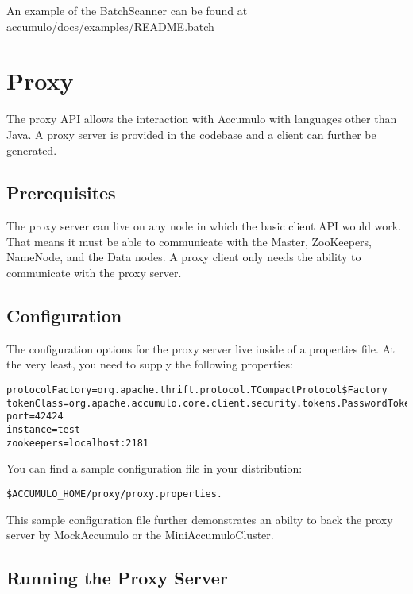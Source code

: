 An example of the BatchScanner can be found at\\
accumulo/docs/examples/README.batch

\section{Proxy}

The proxy API allows the interaction with Accumulo with languages other than Java.
A proxy server is provided in the codebase and a client can further be generated.

\subsection{Prerequisites}

The proxy server can live on any node in which the basic client API would work. That
means it must be able to communicate with the Master, ZooKeepers, NameNode, and the
Data nodes. A proxy client only needs the ability to communicate with the proxy server.


\subsection{Configuration}

The configuration options for the proxy server live inside of a properties file. At
the very least, you need to supply the following properties:

\begingroup\fontsize{8pt}{8pt}\selectfont\begin{verbatim}
protocolFactory=org.apache.thrift.protocol.TCompactProtocol$Factory
tokenClass=org.apache.accumulo.core.client.security.tokens.PasswordToken
port=42424
instance=test
zookeepers=localhost:2181
\end{verbatim}\endgroup

You can find a sample configuration file in your distribution:

\begingroup\fontsize{8pt}{8pt}\selectfont\begin{verbatim}
$ACCUMULO_HOME/proxy/proxy.properties.
\end{verbatim}\endgroup

This sample configuration file further demonstrates an abilty to back the proxy server
by MockAccumulo or the MiniAccumuloCluster.

\subsection{Running the Proxy Server}

